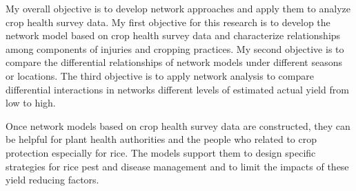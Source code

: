 My overall objective is to develop network approaches and apply them to analyze crop health survey data. My first objective for this research is to develop the network model based on crop health survey data and characterize relationships among components of injuries and cropping practices. My second objective is to compare the differential relationships of network models under different seasons or locations. The third objective is to apply network analysis to compare differential interactions in networks   different levels of estimated actual yield from low to high.


Once network models based on crop health survey data are constructed, they can be helpful for plant health authorities and the people who related to crop protection especially for rice. The models support them to design specific strategies for rice pest and disease management and to limit the impacts of these yield reducing factors.  

